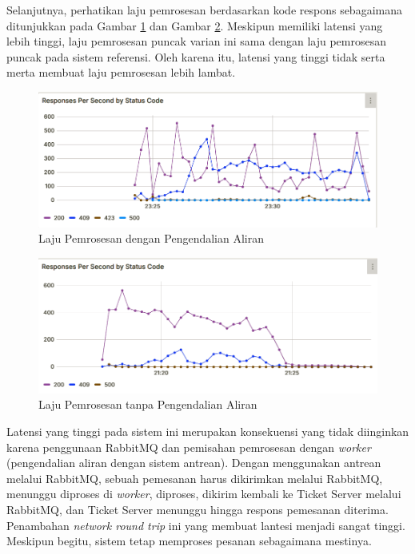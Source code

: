 Selanjutnya, perhatikan laju pemrosesan berdasarkan kode respons sebagaimana ditunjukkan pada Gambar \ref{fig:rps-fc-pg-stress-0} dan Gambar \ref{fig:rps-nofc-pg-stress-0}. Meskipun memiliki latensi yang lebih tinggi, laju pemrosesan puncak varian ini sama dengan laju pemrosesan puncak pada sistem referensi. Oleh karena itu, latensi yang tinggi tidak serta merta membuat laju pemrosesan lebih lambat.

\begin{figure}[H]
    \centering
    \includegraphics[width=1\textwidth]{resources/chapter-4/rps-fc-pg-stress-0.png}
    \caption{Laju Pemrosesan dengan Pengendalian Aliran}
    \label{fig:rps-fc-pg-stress-0}
\end{figure}

\begin{figure}[H]
    \centering
    \includegraphics[width=1\textwidth]{resources/chapter-4/rps-nofc-pg-stress-0.png}
    \caption{Laju Pemrosesan tanpa Pengendalian Aliran}
    \label{fig:rps-nofc-pg-stress-0}
\end{figure}

Latensi yang tinggi pada sistem ini merupakan konsekuensi yang tidak diinginkan karena penggunaan RabbitMQ dan pemisahan pemrosesan dengan \textit{worker} (pengendalian aliran dengan sistem antrean). Dengan menggunakan antrean melalui RabbitMQ, sebuah pemesanan harus dikirimkan melalui RabbitMQ, menunggu diproses di \textit{worker}, diproses, dikirim kembali ke Ticket Server melalui RabbitMQ, dan Ticket Server menunggu hingga respons pemesanan diterima. Penambahan \textit{network round trip} ini yang membuat lantesi menjadi sangat tinggi. Meskipun begitu, sistem tetap memproses pesanan sebagaimana mestinya.

